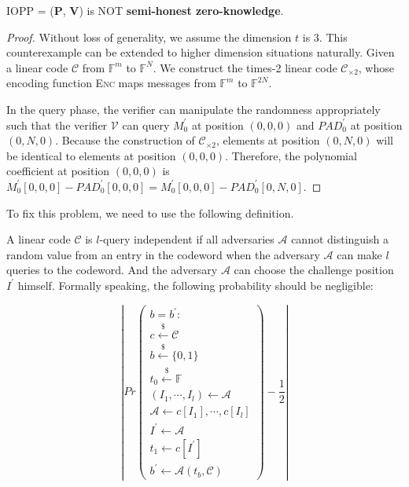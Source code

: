 \begin{lemma}
\label{lemma:szkpc-zk-cexample}

IOPP = ($\textbf{P}$, $\textbf{V}$) is NOT \textbf{semi-honest zero-knowledge}.

\end{lemma}
\begin{proof}

Without loss of generality, we assume the dimension $t$ is 3. This counterexample can be extended to higher dimension situations naturally. Given a linear code $\mathcal{C}$ from $\mathbb{F}^m$ to $\mathbb{F}^N$. We construct the times-2 linear code $\mathcal{C}_{\times 2}$, whose encoding function \textsc{Enc} maps messages from $\mathbb{F}^m$ to $\mathbb{F}^{2N}$.

In the query phase, the verifier can manipulate the randomness appropriately such that the verifier $\mathcal{V}$ can query $M_0^\prime$ at position $(0, 0, 0)$ and $PAD_0^\prime$ at position $(0, N, 0)$.
Because the construction of $\mathcal{C}_{\times 2}$, elements at position $(0, N, 0)$ will be identical to elements at position $(0, 0, 0)$. 
Therefore, the polynomial coefficient at position $(0, 0, 0)$ is $M_0^\prime[0, 0, 0] - PAD_0^\prime[0, 0, 0] = M_0^\prime[0, 0, 0] - PAD_0^\prime[0, N, 0]$.
\end{proof}









To fix this problem, we need to use the following definition.

\begin{definition}
\label{def:l-ind-codeword}
A linear code $\mathcal{C}$ is $l$-query independent if all adversaries $\mathcal{A}$ cannot distinguish a random value from an entry in the codeword when the adversary $\mathcal{A}$ can make $l$ queries to the codeword. And the adversary $\mathcal{A}$ can choose the challenge position $I^\prime$ himself. Formally speaking, the following probability should be negligible:


$$
\left \lvert
Pr
\begin{pmatrix}
 b = b^\prime : \\
 c \overset{{\scriptscriptstyle\$}}{\leftarrow} \mathcal{C} \\
 b \overset{{\scriptscriptstyle\$}}{\leftarrow} \{0, 1\} \\
 t_0 \overset{{\scriptscriptstyle\$}}{\leftarrow} \mathbb{F} \\
 (I_1, \cdots, I_l) \leftarrow \mathcal{A} \\
 \mathcal{A} \leftarrow c[I_1], \cdots, c[I_l] \\
 I^\prime \leftarrow \mathcal{A} \\
 t_1 \leftarrow c[I^\prime] \\
 b^\prime \leftarrow \mathcal{A}(t_b, \mathcal{C})
\end{pmatrix}
- \frac{1}{2}
\right \rvert
$$
\end{definition}

